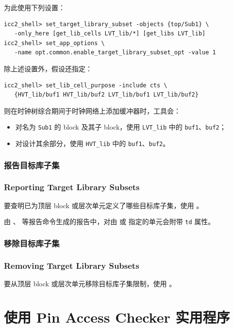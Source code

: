 为此使用下列设置：
\begin{lstlisting}
icc2_shell> set_target_library_subset -objects {top/Sub1} \
   -only_here [get_lib_cells LVT_lib/*] [get_libs LVT_lib]
icc2_shell> set_app_options \
   -name opt.common.enable_target_library_subset_opt -value 1
\end{lstlisting}

除上述设置外，假设还指定：
\begin{lstlisting}
icc2_shell> set_lib_cell_purpose -include cts \
   {HVT_lib/buf1 HVT_lib/buf2 LVT_lib/buf1 LVT_lib/buf2}
\end{lstlisting}

则在时钟树综合期间于时钟网络上添加缓冲器时，工具会：
\begin{itemize}
  \item 对名为 \texttt{Sub1} 的 block 及其子 block，使用 \texttt{LVT\_lib} 中的 \texttt{buf1}、\texttt{buf2}；
  \item 对设计其余部分，使用 \texttt{HVT\_lib} 中的 \texttt{buf1}、\texttt{buf2}。
\end{itemize}

\subsubsection{报告目标库子集}
\subsubsection*{Reporting Target Library Subsets}

要查明已为顶层 block 或层次单元定义了哪些目标库子集，使用 。

由 、 等报告命令生成的报告中，对由  或  指定的单元会附带 \texttt{td} 属性。

\subsubsection{移除目标库子集}
\subsubsection*{Removing Target Library Subsets}

要从顶层 block 或层次单元移除目标库子集限制，使用 。

\section{使用 Pin Access Checker 实用程序}
